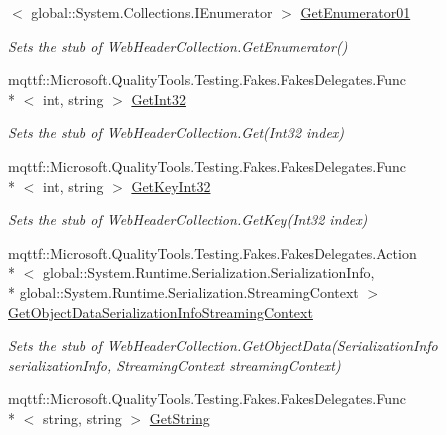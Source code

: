 \begin{DoxyCompactItemize}
$<$ global\-::\-System.\-Collections.\-I\-Enumerator $>$ \hyperlink{class_system_1_1_net_1_1_fakes_1_1_stub_web_header_collection_ad513317edd00be79753681337b5e5c93}{Get\-Enumerator01}
\begin{DoxyCompactList}\small\item\em Sets the stub of Web\-Header\-Collection.\-Get\-Enumerator()\end{DoxyCompactList}\item 
mqttf\-::\-Microsoft.\-Quality\-Tools.\-Testing.\-Fakes.\-Fakes\-Delegates.\-Func\\*
$<$ int, string $>$ \hyperlink{class_system_1_1_net_1_1_fakes_1_1_stub_web_header_collection_a1e993cdccda1989f323dd47be9dda520}{Get\-Int32}
\begin{DoxyCompactList}\small\item\em Sets the stub of Web\-Header\-Collection.\-Get(\-Int32 index)\end{DoxyCompactList}\item 
mqttf\-::\-Microsoft.\-Quality\-Tools.\-Testing.\-Fakes.\-Fakes\-Delegates.\-Func\\*
$<$ int, string $>$ \hyperlink{class_system_1_1_net_1_1_fakes_1_1_stub_web_header_collection_ab5edba684e07486346f845a4c1b9e350}{Get\-Key\-Int32}
\begin{DoxyCompactList}\small\item\em Sets the stub of Web\-Header\-Collection.\-Get\-Key(\-Int32 index)\end{DoxyCompactList}\item 
mqttf\-::\-Microsoft.\-Quality\-Tools.\-Testing.\-Fakes.\-Fakes\-Delegates.\-Action\\*
$<$ global\-::\-System.\-Runtime.\-Serialization.\-Serialization\-Info, \\*
global\-::\-System.\-Runtime.\-Serialization.\-Streaming\-Context $>$ \hyperlink{class_system_1_1_net_1_1_fakes_1_1_stub_web_header_collection_a063f0856dea1792cac0049c6c4a3ed7d}{Get\-Object\-Data\-Serialization\-Info\-Streaming\-Context}
\begin{DoxyCompactList}\small\item\em Sets the stub of Web\-Header\-Collection.\-Get\-Object\-Data(\-Serialization\-Info serialization\-Info, Streaming\-Context streaming\-Context)\end{DoxyCompactList}\item 
mqttf\-::\-Microsoft.\-Quality\-Tools.\-Testing.\-Fakes.\-Fakes\-Delegates.\-Func\\*
$<$ string, string $>$ \hyperlink{class_system_1_1_net_1_1_fakes_1_1_stub_web_header_collection_a1855fcee383d402b4edeea024a1482f8}{Get\-String}

\end{DoxyCompactItemize}
